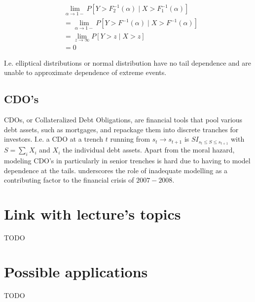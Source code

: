 \documentclass[a4paper,12pt]{article}
\begin{document}
\begin{align}
     & \lim_{\alpha \to 1-}  P[ Y > F_{2}^{-1} ( \alpha) \mid X > F_{1}^{-1} ( \alpha) ] \\
     & =\lim_{\alpha \to 1-}  P[ Y > F^{-1} ( \alpha) \mid X > F^{-1} ( \alpha) ]        \\
     & =\lim_{z \to \infty}  P[ Y > z  \mid X > z ]                                      \\
     & = 0
\end{align}

I.e. elliptical distributions or normal distribution have no tail dependence and are
unable to approximate dependence of extreme events.


\subsection{CDO's}

CDOs, or Collateralized Debt Obligations, are financial tools that pool various debt assets,
such as mortgages, and repackage them into discrete tranches for investors.
I.e. a CDO at a trench $t$ running from $s_{t} \rightarrow s_{t+1}$ is
$S I_{s_{t} \le S \le s_{t+1}}$ with $S = \sum_{i} X_{i}$ and $X_{i}$ the
individual debt assets. Apart from the moral hazard,  modeling CDO's in particularly
in senior trenches is hard due to having to model dependence at the tails.
\cite{donnelly_devil_nodate} underscores the role of inadequate modelling as
a contributing factor to the financial crisis of $2007-2008$.

\section{Link with lecture's topics}
TODO
\section{Possible applications}
TODO



\newpage
\printbibliography
\end{document}
